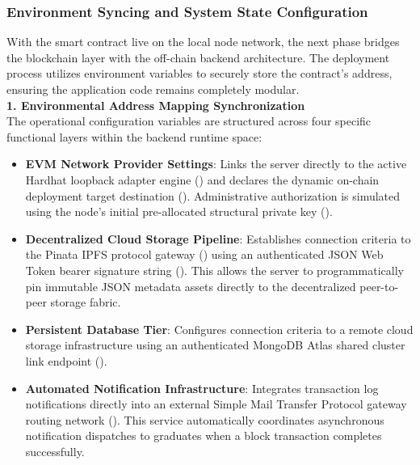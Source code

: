 \subsubsection{Environment Syncing and System State Configuration}

With the smart contract live on the local node network, the next phase bridges the blockchain layer with the off-chain backend architecture. The deployment process utilizes environment variables to securely store the contract's address, ensuring the application code remains completely modular.\\

\textbf{1. Environmental Address Mapping Synchronization}\\

The operational configuration variables are structured across four specific functional layers within the backend runtime space:

\begin{itemize}
    \item \textbf{EVM Network Provider Settings}: Links the server directly to the active Hardhat loopback adapter engine () and declares the dynamic on-chain deployment target destination (). Administrative authorization is simulated using the node's initial pre-allocated structural private key ().
    \item \textbf{Decentralized Cloud Storage Pipeline}: Establishes connection criteria to the Pinata IPFS protocol gateway () using an authenticated JSON Web Token bearer signature string (). This allows the server to programmatically pin immutable JSON metadata assets directly to the decentralized peer-to-peer storage fabric.
    \item \textbf{Persistent Database Tier}: Configures connection criteria to a remote cloud storage infrastructure using an authenticated MongoDB Atlas shared cluster link endpoint ().
    \item \textbf{Automated Notification Infrastructure}: Integrates transaction log notifications directly into an external Simple Mail Transfer Protocol gateway routing network (). This service automatically coordinates asynchronous notification dispatches to graduates when a block transaction completes successfully.
\end{itemize}

